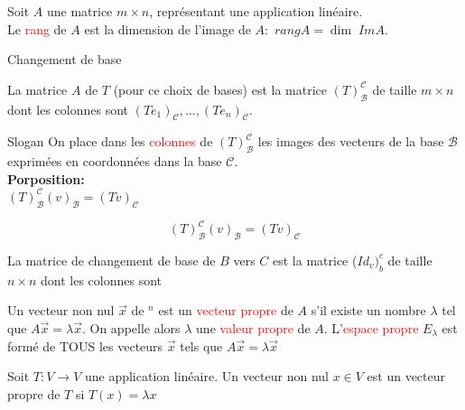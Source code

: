 \begin{definition}
Soit $A$ une matrice $m \times n$, représentant une application linéaire.
\\
    Le \textcolor{red}{rang} de $A$ est la dimension de l'image de $A: $ $rangA = \dim\; ImA$.
\end{definition}
\begin{parag}{Changement de base}
    
\begin{definition}
        La matrice $A$ de $T$ (pour ce choix de bases) est la matrice $\left(T\right)_{\mathcal{B}}^{\mathcal{C}}$ de taille $m \times n$ dont les colonnes sont $\left(Te_1\right)_{\mathcal{C}}, \dots, \left(Te_n\right)_{\mathcal{C}}$.
    \end{definition}
    \begin{subparag}{Slogan}
        On place dans les \textcolor{red}{colonnes} de $\left(T\right)_{\mathcal{B}}^{\mathcal{C}}$ les images des vecteurs de la base $\mathcal{B}$ exprimées en coordonnées dans la base $\mathcal{C}$.
        \\
        \textbf{Porposition:} \\
        $\left(T\right)_{\mathcal{B}}^{\mathcal{C}}\left(v\right)_{\mathcal{B}} = \left(Tv\right)_{\mathcal{C}}$
    \end{subparag}
\end{parag}
        \begin{theoreme}
        \[\left(T\right)_{\mathcal{B}}^{\mathcal{C}}\left(v\right)_{\mathcal{B}} = \left(Tv\right)_{\mathcal{C}}\]
        \end{theoreme}
\begin{definition}
    La matrice de changement de base de $B$ vers $C$ est la matrice ($Id_v)_b^c$ de taille $n \times n$ dont les colonnes sont 
\end{definition}
    \begin{definition}
        Un vecteur non nul $\vec{x}$ de \R$^n$ est un \textcolor{red}{vecteur propre} de $A$ s'il existe un nombre $\lambda$ tel que $A\vec{x} = \lambda \vec{x}$. On appelle alors $\lambda$ une \textcolor{red}{valeur propre} de $A$. L'\textcolor{red}{espace propre} $E_\lambda$ est formé de TOUS les vecteurs $\vec{x}$ tels que $A\vec{x} = \lambda\vec{x}$
    \end{definition}
    \begin{definition}
        Soit $T : V \to V$ une application linéaire. Un vecteur non nul $x \in V$ est un vecteur propre de $T$ si $T(x) = \lambda x$
    \end{definition}
